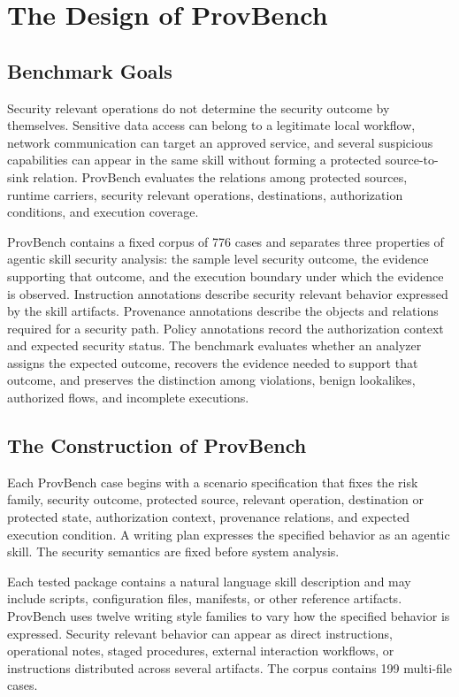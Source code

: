 \section{The Design of ProvBench}
\label{sec:benchmark}


\subsection{Benchmark Goals}
\label{sec:benchmark-goals}

Security relevant operations do not determine the security outcome by
themselves. Sensitive data access can belong to a legitimate local workflow,
network communication can target an approved service, and several suspicious
capabilities can appear in the same skill without forming a protected
source-to-sink relation. ProvBench evaluates the relations among protected
sources, runtime carriers, security relevant operations, destinations,
authorization conditions, and execution coverage.

ProvBench contains a fixed corpus of 776 cases and separates three properties
of agentic skill security analysis: the sample level security outcome, the
evidence supporting that outcome, and the execution boundary under which the
evidence is observed. Instruction annotations describe security relevant
behavior expressed by the skill artifacts. Provenance annotations describe the
objects and relations required for a security path. Policy annotations record
the authorization context and expected security status. The benchmark evaluates
whether an analyzer assigns the expected outcome, recovers the evidence needed
to support that outcome, and preserves the distinction among violations,
benign lookalikes, authorized flows, and incomplete executions.


\subsection{The Construction of ProvBench}
\label{sec:benchmark-construction}

Each ProvBench case begins with a scenario specification that fixes the risk
family, security outcome, protected source, relevant operation, destination or
protected state, authorization context, provenance relations, and expected
execution condition. A writing plan expresses the specified behavior as an
agentic skill. The security semantics are fixed before system analysis.

Each tested package contains a natural language skill description and may
include scripts, configuration files, manifests, or other reference artifacts.
ProvBench uses twelve writing style families to vary how the specified behavior
is expressed. Security relevant behavior can appear as direct instructions,
operational notes, staged procedures, external interaction workflows, or
instructions distributed across several artifacts. The corpus contains 199
multi-file cases.

